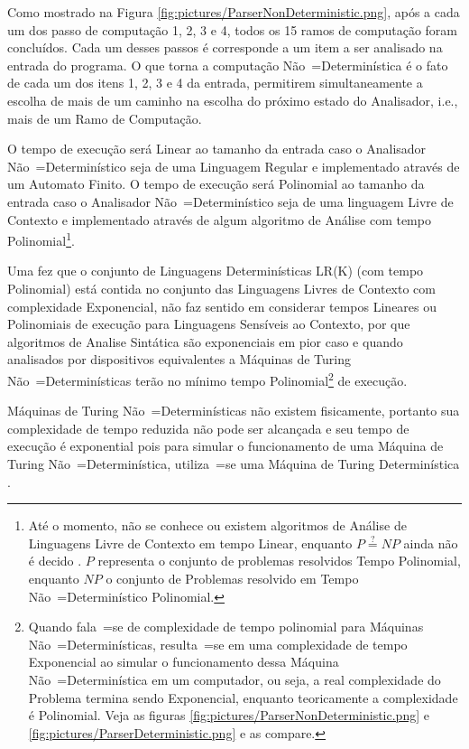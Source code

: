 {    Como mostrado na Figura \ref{fig:pictures/ParserNonDeterministic.png},
    após a cada um dos passo de computação 1,
    2, 3 e 4,
    todos os 15 ramos de computação foram concluídos.
    Cada um desses passos é corresponde a um item a ser analisado na entrada do programa.
    O que torna a computação Não~=Determinística é o fato de cada um dos itens 1,
    2, 3 e 4 da entrada,
    permitirem simultaneamente a escolha de mais de um caminho na escolha do próximo estado do Analisador,
    i.e.,
    mais de um Ramo de Computação.

    O tempo de execução será Linear ao tamanho da entrada caso o Analisador Não~=Determinístico seja de uma Linguagem Regular e
    implementado através de um Automato Finito.
    O tempo de execução será Polinomial ao tamanho da entrada caso o Analisador Não~=Determinístico seja de uma linguagem Livre de Contexto e
    implementado através de algum algoritmo de Análise com tempo Polinomial\footnote{Até o momento,
    não se conhece ou
    existem algoritmos de Análise de Linguagens Livre de Contexto em tempo Linear,
    enquanto $P \stackrel{?}{=} NP$ ainda não é decido \cite{computationalComplexityAuroraBarak,turingMachinesRoyer}.
    $P$ representa o conjunto de problemas resolvidos Tempo Polinomial,
    enquanto $NP$ o conjunto de Problemas resolvido em Tempo Não~=Determinístico Polinomial.}.

    Uma fez que o conjunto de Linguagens Determinísticas LR(K) (com tempo Polinomial) está contida no conjunto das Linguagens Livres de Contexto com complexidade Exponencial,
    não faz sentido em considerar tempos Lineares ou
    Polinomiais de execução para Linguagens Sensíveis ao Contexto,
    por que algoritmos de Analise Sintática são exponenciais em pior caso \cite{contextSensitiveParsing} e
    quando analisados por dispositivos equivalentes a Máquinas de Turing Não~=Determinísticas terão no mínimo tempo Polinomial\footnote{Quando fala~=se de complexidade de tempo polinomial para Máquinas Não~=Determinísticas,
    resulta~=se em uma complexidade de tempo Exponencial ao simular o funcionamento dessa Máquina Não~=Determinística em um computador,
    ou seja,
    a real complexidade do Problema termina sendo Exponencial,
    enquanto teoricamente a complexidade é Polinomial.
    Veja as figuras \ref{fig:pictures/ParserNonDeterministic.png} e
    \ref{fig:pictures/ParserDeterministic.png} e
    as compare.} de execução.

    Máquinas de Turing Não~=Determinísticas não existem fisicamente,
    portanto sua complexidade de tempo reduzida não pode ser alcançada e
    seu tempo de execução é exponential pois para simular o funcionamento de uma Máquina de Turing Não~=Determinística,
    utiliza~=se uma Máquina de Turing Determinística \cite{sipserBook,turingMachinesRoyer}.

}

